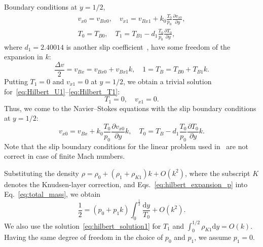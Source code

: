\documentclass[]{jfm}
\newcommand{\dd}{\mathrm{d}}
\newcommand{\pder}[2][]{\frac{\partial#1}{\partial#2}}
\newcommand{\OO}[1]{O\left(#1\right)}
\begin{document}
Boundary conditions at \(y=1/2\),
\begin{gather}
    v_{x0} = v_{Bx0}, \quad v_{x1} = v_{Bx1} + k_0 \frac{T_0}{p_0} \pder[v_{x0}]{y}, \label{eq:hilbert_bc_U}\\
    T_0 = T_{B0}, \quad T_1 = T_{B1} - d_1 \frac{T_0}{p_0} \pder[T_0]{y}, \label{eq:hilbert_bc_T}
\end{gather}
where \(d_1 = 2.40014\) is another slip coefficient~\citep{Takata2015},
have some freedom of the expansion in \(k\):
\begin{equation}\label{eq:hilbert_boundary_expansion}
    \frac{\Delta{v}}2 = v_{Bx} = v_{Bx0} + v_{Bx1}k, \quad 1 = T_B = T_{B0} + T_{B1}k.
\end{equation}
Putting \(T_1 = 0\) and \(v_{x1} = 0\) at \(y=1/2\), we obtain a trivial solution
for~\eqref{eq:Hilbert_U1}--\eqref{eq:Hilbert_T1}:
\begin{equation}\label{eq:hilbert_solution1}
    T_1 = 0, \quad v_{x1} = 0.
\end{equation}
Thus, we come to the Navier--Stokes equations with the slip boundary conditions at \(y=1/2\):
\begin{equation}\label{eq:hilbert_slip_bc}
    v_{x0} = v_{Bx} + k_0 \frac{T_0}{p_0} \pder[v_{x0}]{y} k, \quad
    T_0 = T_B - d_1 \frac{T_0}{p_0} \pder[T_0]{y} k.
\end{equation}
Note that the slip boundary conditions for the linear problem used in~\citet{Sharipov2000}
are not correct in case of finite Mach numbers.

Substituting the density \(\rho = \rho_0 + (\rho_1+\rho_{K1})k + \OO{k^2}\),
where the subscript \(K\) denotes the Knudsen-layer correction,
and Eqs.~\eqref{eq:hilbert_expansion_p} into Eq.~\eqref{eq:total_mass}, we obtain
\begin{equation}\label{eq:hilbert_total_mass}
    \frac12 = (p_0 + p_1k)\int_{0}^\frac12\frac{\dd y}{T_0} + \OO{k^2}.
\end{equation}
We also use the solution~\eqref{eq:hilbert_solution1} for \(T_1\) and \(\int_{0}^{1/2}\rho_{K1}\dd{y} = \OO{k}\).
Having the same degree of freedom in the choice of \(p_0\) and \(p_1\), we assume \(p_1 = 0\).
\end{document}
